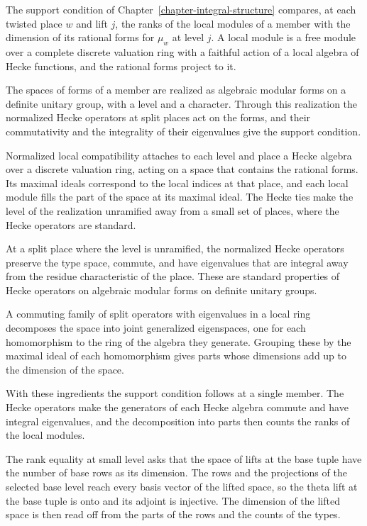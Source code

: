 The support condition of Chapter~\ref{chapter-integral-structure} compares, at
each twisted place $w$ and lift $j$, the ranks of the local modules of a member
with the dimension of its rational forms for $\mu_w$ at level $j$. A local
module is a free module over a complete discrete valuation ring with a faithful
action of a local algebra of Hecke functions, and the rational forms project to
it.

The spaces of forms of a member are realized as algebraic modular forms on a
definite unitary group, with a level and a character. Through this realization
the normalized Hecke operators at split places act on the forms, and their
commutativity and the integrality of their eigenvalues give the support
condition.

Normalized local compatibility attaches to each level and place a Hecke
algebra over a discrete valuation ring, acting on a space that contains the
rational forms. Its maximal ideals correspond to the local indices at that
place, and each local module fills the part of the space at its maximal ideal.
The Hecke ties make the level of the realization unramified away from a small
set of places, where the Hecke operators are standard.

At a split place where the level is unramified, the normalized Hecke operators
preserve the type space, commute, and have eigenvalues that are integral away
from the residue characteristic of the place. These are standard properties of
Hecke operators on algebraic modular forms on definite unitary groups.

A commuting family of split operators with eigenvalues in a local ring
decomposes the space into joint generalized eigenspaces, one for each
homomorphism to the ring of the algebra they generate. Grouping these by the
maximal ideal of each homomorphism gives parts whose dimensions add up to the
dimension of the space.

With these ingredients the support condition follows at a single member. The
Hecke operators make the generators of each Hecke algebra commute and have
integral eigenvalues, and the decomposition into parts then counts the ranks of
the local modules.

The rank equality at small level asks that the space of lifts at the base tuple
have the number of base rows as its dimension. The rows and the projections of
the selected base level reach every basis vector of the lifted space, so the
theta lift at the base tuple is onto and its adjoint is injective. The
dimension of the lifted space is then read off from the parts of the rows and
the counts of the types.

